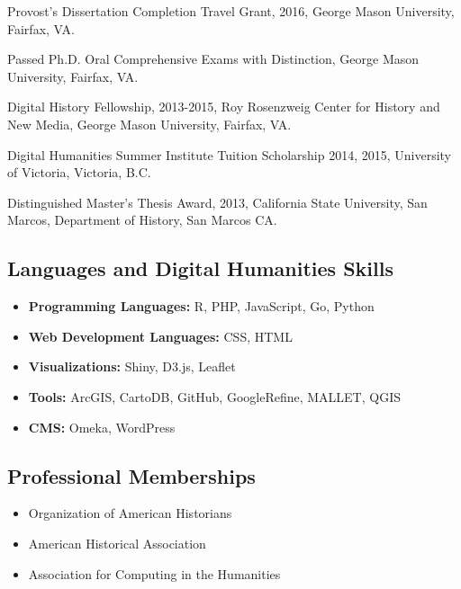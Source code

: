 \documentclass[11pt]{article}
\begin{document}
Provost's Dissertation Completion Travel Grant, 2016, George Mason University, Fairfax, VA.

Passed Ph.D. Oral Comprehensive Exams with Distinction, George Mason University, Fairfax, VA.

Digital History Fellowship, 2013-2015, Roy Rosenzweig Center for History and New Media, George Mason University, Fairfax, VA.

Digital Humanities Summer Institute Tuition Scholarship 2014, 2015, University of Victoria, Victoria, B.C.

Distinguished Master's Thesis Award, 2013, California State University, San Marcos, Department of History, San Marcos CA.


\subsection{Languages and Digital Humanities Skills}
\begin{itemize}
  \itemsep0em 
  \item\textbf{Programming Languages:} R, PHP, JavaScript, Go, Python
  \item\textbf{Web Development Languages:} CSS, HTML
  \item\textbf{Visualizations:} Shiny, D3.js, Leaflet
  \item\textbf{Tools:} ArcGIS, CartoDB, GitHub, GoogleRefine, MALLET, QGIS
  \item\textbf{CMS:} Omeka, WordPress
\end{itemize}

\subsection{Professional Memberships}
\begin{itemize}
  \itemsep0em 
  \item{Organization of American Historians}
  \item{American Historical Association}
  \item{Association for Computing in the Humanities}
\end{itemize}
\end{document}
